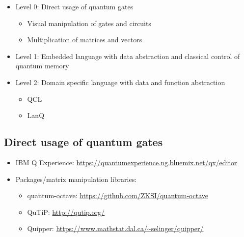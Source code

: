 \documentclass{beamer}
\begin{document}
\begin{frame}{\insertsection}

  \begin{itemize}
    \item Level 0: Direct usage of quantum gates
        \begin{itemize}
            \item Visual manipulation of gates and circuits
            \item Multiplication of matrices and vectors 
        \end{itemize}
    \item Level 1: Embedded language with data abstraction and classical 
    control of quantum memory
    \item Level 2: Domain specific language with data and function abstraction
        \begin{itemize}
            \item QCL
            \item LanQ
        \end{itemize}
  \end{itemize}
\end{frame}


\subsection{Direct usage of quantum gates}
\begin{frame}{\insertsection}{\insertsubsection}
    \begin{itemize}
    \item IBM Q Experience: 
    {\small\url{https://quantumexperience.ng.bluemix.net/qx/editor}}
    \item Packages/matrix manipulation libraries:
    \begin{itemize}
        \item quantum-octave: 
        {\small \url{https://github.com/ZKSI/quantum-octave}}
        \item QuTiP: {\small\url{http://qutip.org/}}
        \item Quipper: 
        {\small\url{https://www.mathstat.dal.ca/~selinger/quipper/}}
    \end{itemize}
    \end{itemize}

\end{frame}
\end{document}
